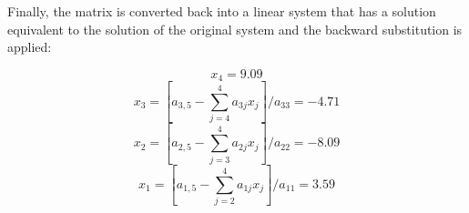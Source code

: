 \begin{solution}
Finally, the matrix is converted back into a linear system that has a solution equivalent to the solution of the original system and the backward substitution is applied:


$$ 
 x_{4}=9.09 
 $$ 
$$ 
 x_{3}=\left[a_{3, 5}-\sum_{j=4}^{4} a_{3 j} x_{j}\right] / a_{3 3}=-4.71 
 $$ 
$$ 
 x_{2}=\left[a_{2, 5}-\sum_{j=3}^{4} a_{2 j} x_{j}\right] / a_{2 2}=-8.09 
 $$ 
$$ 
 x_{1}=\left[a_{1, 5}-\sum_{j=2}^{4} a_{1 j} x_{j}\right] / a_{1 1}=3.59 
 $$ 









\end{solution}
